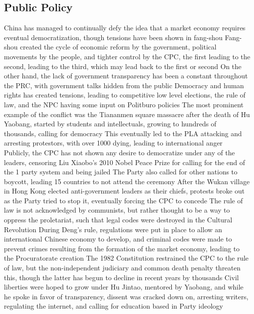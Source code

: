 \documentclass[11 pt, twoside]{article}
\newenvironment{outline*}
{
	\begin{outline}[enumerate]
	}
	{\end{outline}
}
\begin{document}
\subsection{Public Policy}
\begin{outline*}
\1 China has managed to continually defy the idea that a market economy requires eventual democratization, though tensions have been shown in fang-shou
\2 Fang-shou created the cycle of economic reform by the government, political movements by the people, and tighter control by the CPC, the first leading to the second, leading to the third, which may lead back to the first or second
\2 On the other hand, the lack of government transparency has been a constant throughout the PRC, with government talks hidden from the public
\1 Democracy and human rights has created tensions, leading to competitive low level elections, the rule of law, and the NPC having some input on Politburo policies
\2 The most prominent example of the conflict was the Tiananmen square massacre after the death of Hu Yaobang, started by students and intellectuals, growing to hundreds of thousands, calling for democracy
\3 This eventually led to the PLA attacking and arresting protestors, with over 1000 dying, leading to international anger
\3 Publicly, the CPC has not shown any desire to democratize under any of the leaders, censoring Liu Xiaobo's 2010 Nobel Peace Prize for calling for the end of the 1 party system and being jailed
\4 The Party also called for other nations to boycott, leading 15 countries to not attend the ceremony
\3 After the Wukan village in Hong Kong elected anti-government leaders as their chiefs, protests broke out as the Party tried to stop it, eventually forcing the CPC to concede
\2 The rule of law is not acknowledged by communists, but rather thought to be a way to oppress the proletariat, such that legal codes were destroyed in the Cultural Revolution
\3 During Deng's rule, regulations were put in place to allow an international Chinese economy to develop, and criminal codes were made to prevent crimes resulting from the formation of the market economy, leading to the Procuratorate creation
\3 The 1982 Constitution restrained the CPC to the rule of law, but the non-independent judiciary and common death penalty threaten this, though the latter has begun to decline in recent years by thousands
\2 Civil liberties were hoped to grow under Hu Jintao, mentored by Yaobang, and while he spoke in favor of transparency, dissent was cracked down on, arresting writers, regulating the internet, and calling for education based in Party ideology

\end{outline*}
\end{document}
